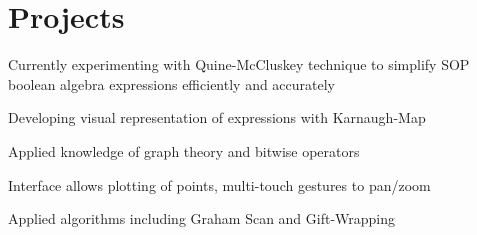 \documentclass[]{deedy-resume-openfont}
\begin{document}
\begin{minipage}[t]{0.66\textwidth}


\section{Projects}

\begin{tightemize}
\item Currently experimenting with Quine-McCluskey technique to simplify SOP boolean algebra expressions efficiently and accurately\\
\item Developing visual representation of expressions with Karnaugh-Map\\
\item Applied knowledge of graph theory and bitwise operators\\
\end{tightemize}
\sectionsep

\begin{tightemize}
\item Interface allows plotting of points, multi-touch gestures to pan/zoom\\
\item Applied algorithms including Graham Scan and Gift-Wrapping\\
\end{tightemize}
\sectionsep



\end{minipage}
\end{document}
